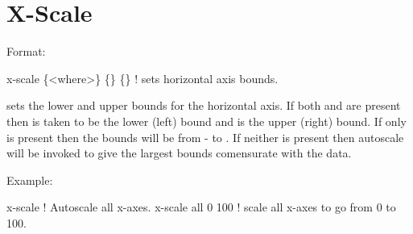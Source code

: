 \section{X-Scale}
\label{s:x-scale}

Format:
\begin{example}
  x-scale \{<where>\} \{<bound1>\} \{<bound2>\}  ! sets horizontal axis bounds.
\end{example}

\vskip 0.2in 
 sets the lower and upper bounds for the horizontal axis.
If both  and  are present then 
is taken to be the lower (left) bound and  is the upper
(right) bound. If only  is present then the bounds will
be from - to . If neither is present then
autoscale will be invoked to give the largest bounds comensurate with
the data.

Example:
\begin{example}
  x-scale            ! Autoscale all x-axes.
  x-scale all 0 100  ! scale all x-axes to go from 0 to 100.
\end{example}

